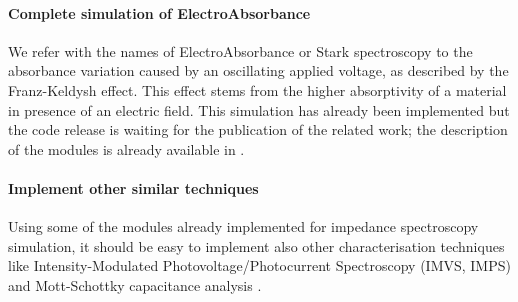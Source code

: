 \paragraph{Complete simulation of ElectroAbsorbance}
We refer with the names of ElectroAbsorbance or Stark spectroscopy to the absorbance variation caused by an oscillating applied voltage, as described by the Franz\hyp{}Keldysh effect.
This effect stems from the higher absorptivity of a material in presence of an electric field.
This simulation has already been implemented but the code release is waiting for the publication of the related work; the description of the modules is already available in .

\paragraph{Implement other similar techniques}
Using some of the modules already implemented for impedance spectroscopy simulation, it should be easy to implement also other characterisation techniques like Intensity-Modulated Photovoltage/Photocurrent Spectroscopy (IMVS, IMPS) \cite{Pockett2015,Guillen2014} and Mott-Schottky capacitance analysis \cite{Almora2016}.

